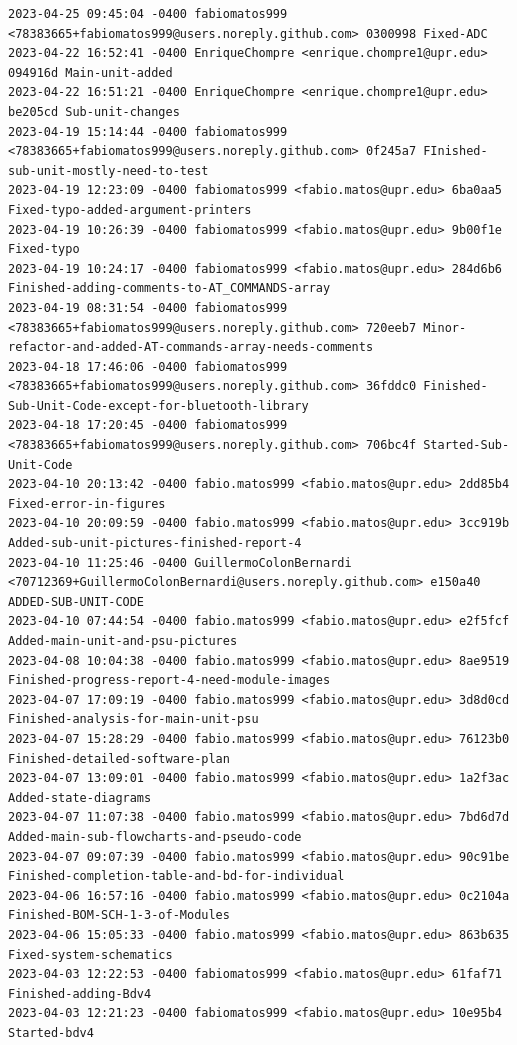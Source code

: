 \documentclass[12pt]{article}
\begin{document}
\begin{verbatim}
2023-04-25 09:45:04 -0400 fabiomatos999 <78383665+fabiomatos999@users.noreply.github.com> 0300998 Fixed-ADC
2023-04-22 16:52:41 -0400 EnriqueChompre <enrique.chompre1@upr.edu> 094916d Main-unit-added
2023-04-22 16:51:21 -0400 EnriqueChompre <enrique.chompre1@upr.edu> be205cd Sub-unit-changes
2023-04-19 15:14:44 -0400 fabiomatos999 <78383665+fabiomatos999@users.noreply.github.com> 0f245a7 FInished-sub-unit-mostly-need-to-test
2023-04-19 12:23:09 -0400 fabiomatos999 <fabio.matos@upr.edu> 6ba0aa5 Fixed-typo-added-argument-printers
2023-04-19 10:26:39 -0400 fabiomatos999 <fabio.matos@upr.edu> 9b00f1e Fixed-typo
2023-04-19 10:24:17 -0400 fabiomatos999 <fabio.matos@upr.edu> 284d6b6 Finished-adding-comments-to-AT_COMMANDS-array
2023-04-19 08:31:54 -0400 fabiomatos999 <78383665+fabiomatos999@users.noreply.github.com> 720eeb7 Minor-refactor-and-added-AT-commands-array-needs-comments
2023-04-18 17:46:06 -0400 fabiomatos999 <78383665+fabiomatos999@users.noreply.github.com> 36fddc0 Finished-Sub-Unit-Code-except-for-bluetooth-library
2023-04-18 17:20:45 -0400 fabiomatos999 <78383665+fabiomatos999@users.noreply.github.com> 706bc4f Started-Sub-Unit-Code
2023-04-10 20:13:42 -0400 fabio.matos999 <fabio.matos@upr.edu> 2dd85b4 Fixed-error-in-figures
2023-04-10 20:09:59 -0400 fabio.matos999 <fabio.matos@upr.edu> 3cc919b Added-sub-unit-pictures-finished-report-4
2023-04-10 11:25:46 -0400 GuillermoColonBernardi <70712369+GuillermoColonBernardi@users.noreply.github.com> e150a40 ADDED-SUB-UNIT-CODE
2023-04-10 07:44:54 -0400 fabio.matos999 <fabio.matos@upr.edu> e2f5fcf Added-main-unit-and-psu-pictures
2023-04-08 10:04:38 -0400 fabio.matos999 <fabio.matos@upr.edu> 8ae9519 Finished-progress-report-4-need-module-images
2023-04-07 17:09:19 -0400 fabio.matos999 <fabio.matos@upr.edu> 3d8d0cd Finished-analysis-for-main-unit-psu
2023-04-07 15:28:29 -0400 fabio.matos999 <fabio.matos@upr.edu> 76123b0 Finished-detailed-software-plan
2023-04-07 13:09:01 -0400 fabio.matos999 <fabio.matos@upr.edu> 1a2f3ac Added-state-diagrams
2023-04-07 11:07:38 -0400 fabio.matos999 <fabio.matos@upr.edu> 7bd6d7d Added-main-sub-flowcharts-and-pseudo-code
2023-04-07 09:07:39 -0400 fabio.matos999 <fabio.matos@upr.edu> 90c91be Finished-completion-table-and-bd-for-individual
2023-04-06 16:57:16 -0400 fabio.matos999 <fabio.matos@upr.edu> 0c2104a Finished-BOM-SCH-1-3-of-Modules
2023-04-06 15:05:33 -0400 fabio.matos999 <fabio.matos@upr.edu> 863b635 Fixed-system-schematics
2023-04-03 12:22:53 -0400 fabiomatos999 <fabio.matos@upr.edu> 61faf71 Finished-adding-Bdv4
2023-04-03 12:21:23 -0400 fabiomatos999 <fabio.matos@upr.edu> 10e95b4 Started-bdv4

\end{verbatim}
\end{document}
